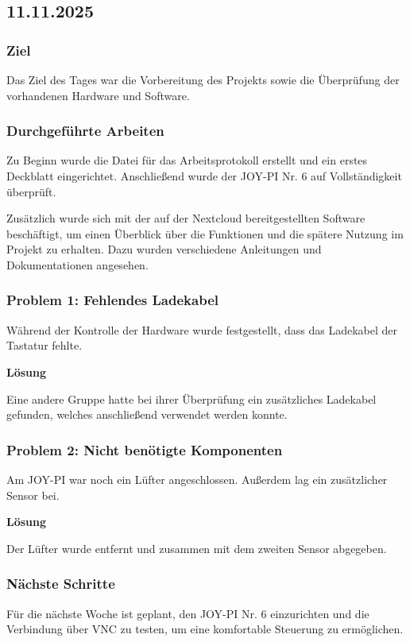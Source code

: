 \subsection{11.11.2025}

\subsubsection{Ziel}
Das Ziel des Tages war die Vorbereitung des Projekts sowie die
Überprüfung der vorhandenen Hardware und Software.

\subsubsection{Durchgeführte Arbeiten}
Zu Beginn wurde die Datei für das Arbeitsprotokoll erstellt und ein
erstes Deckblatt eingerichtet. Anschließend wurde der JOY-PI Nr. 6
auf Vollständigkeit überprüft. 

Zusätzlich wurde sich mit der auf der Nextcloud bereitgestellten
Software beschäftigt, um einen Überblick über die Funktionen und
die spätere Nutzung im Projekt zu erhalten. Dazu wurden verschiedene
Anleitungen und Dokumentationen angesehen.

\subsubsection{Problem 1: Fehlendes Ladekabel}

Während der Kontrolle der Hardware wurde festgestellt,
dass das Ladekabel der Tastatur fehlte.

\textbf{Lösung}

Eine andere Gruppe hatte bei ihrer Überprüfung ein zusätzliches
Ladekabel gefunden, welches anschließend verwendet werden konnte.

\subsubsection{Problem 2: Nicht benötigte Komponenten}

Am JOY-PI war noch ein Lüfter angeschlossen.
Außerdem lag ein zusätzlicher Sensor bei.

\textbf{Lösung}

Der Lüfter wurde entfernt und zusammen mit dem zweiten
Sensor abgegeben.

\subsubsection{Nächste Schritte}
Für die nächste Woche ist geplant, den JOY-PI Nr. 6 einzurichten und 
die Verbindung über VNC zu testen, um eine komfortable Steuerung zu ermöglichen.
